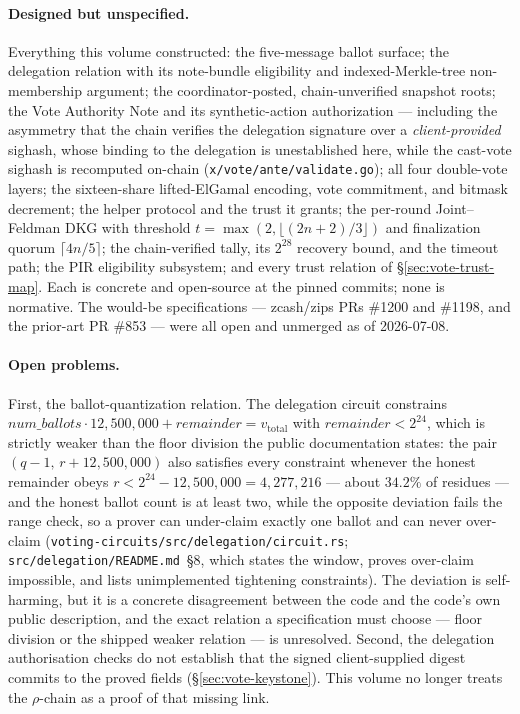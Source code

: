 \documentclass[11pt,a4paper]{article}
\theoremstyle{definition}
\begin{document}
\paragraph{Designed but unspecified.} Everything this volume constructed:
the five-message ballot surface; the delegation relation with its
note-bundle eligibility and indexed-Merkle-tree non-membership argument;
the coordinator-posted, chain-unverified snapshot roots; the Vote
Authority Note and its synthetic-action authorization --- including the
asymmetry that the chain verifies the delegation signature over a
\emph{client-provided} sighash, whose binding to the delegation is
unestablished here, while the cast-vote sighash is recomputed on-chain
(\texttt{x/vote/ante/validate.go}); all four double-vote layers; the
sixteen-share lifted-ElGamal encoding, vote commitment, and bitmask
decrement; the helper protocol and the trust it grants; the per-round
Joint--Feldman DKG with threshold $t = \max(2, \lfloor (2n+2)/3 \rfloor)$
and finalization quorum $\lceil 4n/5 \rceil$; the chain-verified tally,
its $2^{28}$ recovery bound, and the timeout path; the PIR eligibility
subsystem; and every trust relation of \S\ref{sec:vote-trust-map}. Each is
concrete and open-source at the pinned commits; none is normative. The
would-be specifications --- zcash/zips PRs \#1200 and \#1198, and the
prior-art PR \#853 --- were all open and unmerged as of 2026-07-08.

\paragraph{Open problems.} First, the ballot-quantization relation. The
delegation circuit constrains
$\mathit{num\_ballots} \cdot 12{,}500{,}000 + \mathit{remainder} =
v_{\mathrm{total}}$ with $\mathit{remainder} < 2^{24}$, which is strictly
weaker than the floor division the public documentation states: the pair
$(q-1,\, r+12{,}500{,}000)$ also satisfies every constraint whenever the
honest remainder obeys
$r < 2^{24} - 12{,}500{,}000 = 4{,}277{,}216$ --- about $34.2\%$ of
residues --- and the honest ballot count is at least two, while the
opposite deviation fails the range check, so a
prover can under-claim exactly one ballot and can never over-claim
(\texttt{voting-circuits/src/delegation/circuit.rs};
\texttt{src/delegation/README.md}~\S8, which states the window, proves
over-claim impossible, and lists unimplemented tightening constraints).
The deviation is self-harming, but it is a concrete
disagreement between the code and the code's own public description, and
the exact relation a specification must choose --- floor division or the
shipped weaker relation --- is unresolved. Second, the delegation
authorisation checks do not establish that the signed client-supplied
digest commits to the proved fields (\S\ref{sec:vote-keystone}). This
volume no longer treats the $\rho$-chain as a proof of that missing link.
\end{document}
